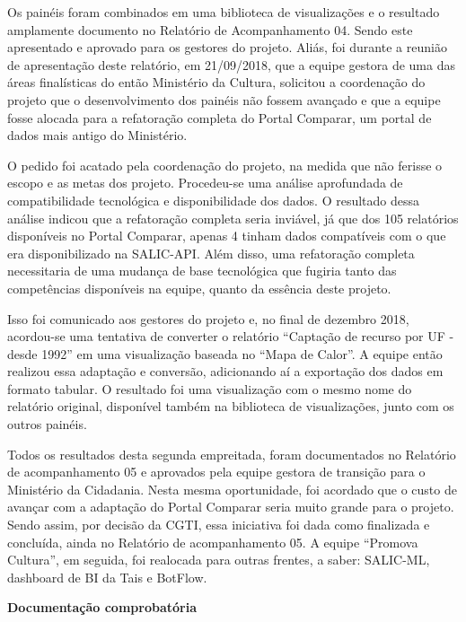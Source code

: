 Os painéis foram combinados em uma biblioteca de visualizações e o
resultado amplamente documento no Relatório de Acompanhamento 04. Sendo
este apresentado e aprovado para os gestores do projeto. Aliás, foi
durante a reunião de apresentação deste relatório, em 21/09/2018, que a
equipe gestora de uma das áreas finalísticas do então Ministério da
Cultura, solicitou a coordenação do projeto que o desenvolvimento dos
painéis não fossem avançado e que a equipe fosse alocada para a
refatoração completa do Portal Comparar, um portal de dados mais antigo
do Ministério.

O pedido foi acatado pela coordenação do projeto, na medida que não
ferisse o escopo e as metas dos projeto. Procedeu-se uma análise
aprofundada de compatibilidade tecnológica e disponibilidade dos dados.
O resultado dessa análise indicou que a refatoração completa seria
inviável, já que dos 105 relatórios disponíveis no Portal Comparar,
apenas 4 tinham dados compatíveis com o que era disponibilizado na
SALIC-API. Além disso, uma refatoração completa necessitaria de uma
mudança de base tecnológica que fugiria tanto das competências
disponíveis na equipe, quanto da essência deste projeto.

Isso foi comunicado aos gestores do projeto e, no final de dezembro
2018, acordou-se uma tentativa de converter o relatório ``Captação de
recurso por UF - desde 1992'' em uma visualização baseada no ``Mapa de
Calor''. A equipe então realizou essa adaptação e conversão, adicionando
aí a exportação dos dados em formato tabular. O resultado foi uma
visualização com o mesmo nome do relatório original, disponível também
na biblioteca de visualizações, junto com os outros painéis.

Todos os resultados desta segunda empreitada, foram documentados no
Relatório de acompanhamento 05 e aprovados pela equipe gestora de
transição para o Ministério da Cidadania. Nesta mesma oportunidade, foi
acordado que o custo de avançar com a adaptação do Portal Comparar seria
muito grande para o projeto. Sendo assim, por decisão da CGTI, essa
iniciativa foi dada como finalizada e concluída, ainda no Relatório de
acompanhamento 05. A equipe ``Promova Cultura'', em seguida, foi
realocada para outras frentes, a saber: SALIC-ML, dashboard de BI da
Tais e BotFlow.

\textbf{Documentação comprobatória}

